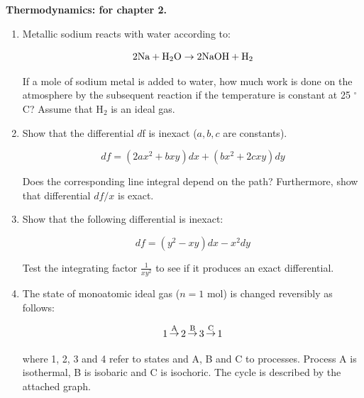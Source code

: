 \noindent
\textbf{Thermodynamics:
 for chapter 2.}\\

\begin{enumerate}

\item Metallic sodium reacts with water according to:

$$2\textnormal{Na} + \textnormal{H}_2\textnormal{O} \rightarrow 2\textnormal{NaOH} + \textnormal{H}_2$$

If a mole of sodium metal is added to water, how much work is done on the atmosphere by the subsequent reaction if the temperature is constant at 25 $^\circ$C? Assume that H$_2$ is an ideal gas.


\item Show that the differential $d$f is inexact ($a,b,c$ are constants).

$$df = \left(2ax^2 + bxy\right)dx + \left(bx^2 + 2cxy\right)dy$$

Does the corresponding line integral depend on the path? Furthermore, show that differential $df / x$ is exact.


\item Show that the following differential is inexact:

$$df = \left(y^2 - xy\right)dx - x^2dy$$

Test the integrating factor $\frac{1}{xy^2}$ to see if it produces an exact differential.


\item The state of monoatomic ideal gas ($n = 1$ mol) is changed reversibly as follows:

$$1 \mathop\rightarrow\limits^{\textnormal{A}} 2 \mathop\rightarrow\limits^{\textnormal{B}} 3 \mathop\rightarrow\limits^{\textnormal{C}} 1$$

where 1, 2, 3 and 4 refer to states and A, B and C to processes. Process A is isothermal, B is isobaric and C is isochoric. The cycle is described by the attached graph.


\end{enumerate}
